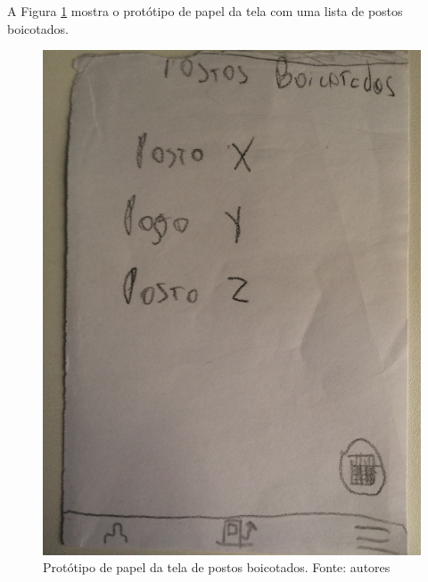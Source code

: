 A Figura \ref{img:prototipo_de_papel_postos_boicotados} mostra o protótipo de papel da tela com uma lista de postos boicotados.
\begin{figure}[H]
    \centering
    \includegraphics[scale=0.1, angle=-90]{figuras/prototipo_papel_postos_boicotados.jpg}
    \caption[Protótipo de papel da tela de postos boicotados]{Protótipo de papel da tela de postos boicotados. Fonte: autores}
    \label{img:prototipo_de_papel_postos_boicotados}
\end{figure}
 \pagebreak

